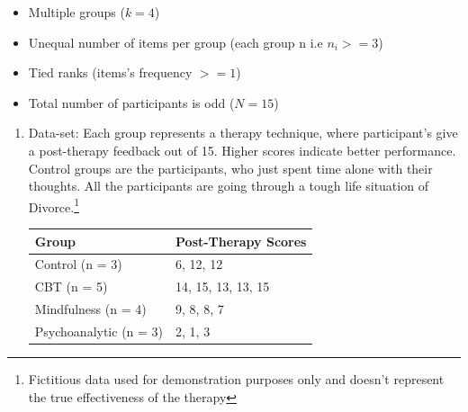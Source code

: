 \documentclass[a4paper,fleqn,review]{cas-sc}
\begin{document}
\begin{itemize}
	\item Multiple groups ($k = 4$)
	\item Unequal number of items per group (each group n i.e $n_i >= 3$)
	\item Tied ranks (items's frequency $>=1$)
	\item Total number of participants is odd ($N = 15$)
\end{itemize}
\pagebreak
\begin{enumerate}[Step 1.]
	\item Data-set: Each group represents a therapy technique, where participant's give a post-therapy feedback out of 15. Higher scores indicate better performance. Control groups are the participants, who just spent time alone with their thoughts. All the participants are going through a tough life situation of Divorce.\footnote{Fictitious data used for demonstration purposes only and doesn't represent the true effectiveness of the therapy}
	\begin{center}
		\renewcommand{\arraystretch}{1.3}
		\begin{tabular}{|l|l|}
			\hline
			\textbf{Group} & \textbf{Post-Therapy Scores} \\
			\hline
			Control (n = 3) & 6, 12, 12 \\
			CBT (n = 5) & 14, 15, 13, 13, 15 \\
			Mindfulness (n = 4) & 9, 8, 8, 7 \\
			Psychoanalytic (n = 3) & 2, 1, 3 \\
			\hline
		\end{tabular}
	\end{center}
	

\end{enumerate}
\end{document}
